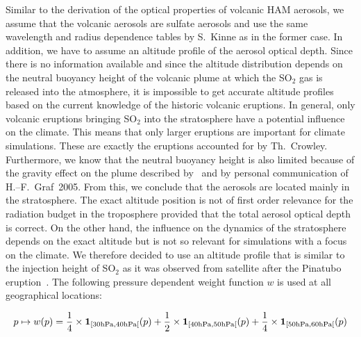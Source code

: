 \begin{appendix}
Similar to the derivation of the optical properties of volcanic HAM aerosols,
we assume that the volcanic aerosols are sulfate aerosols and use the
same wavelength and radius dependence tables by S.~Kinne as in the
former case. In addition, we have to assume an altitude profile of the
aerosol optical depth. Since there is no information available and
since the altitude distribution depends on the neutral buoyancy height
of the volcanic plume at which the 
SO$_2$ gas is released into the atmosphere, it is impossible to get
accurate altitude 
profiles based on the current knowledge of the historic volcanic
eruptions. In general, only volcanic eruptions bringing SO$_2$ into
the stratosphere have a potential influence on the climate. This means
that only larger eruptions are important for climate
simulations. These are exactly the eruptions accounted for by
Th.~Crowley. Furthermore, we know that the neutral buoyancy height is also
limited because of the gravity effect on the plume described
by~\cite{her106, tim093} and by personal communication of H.--F.~Graf~2005. From
this, we conclude that the aerosols are located mainly in the
stratosphere. The exact altitude position is not of first order
relevance for the radiation budget in the troposphere provided that the total
aerosol optical depth is correct. On the other hand, the influence on
the dynamics of the stratosphere depends on the exact altitude but is
not so relevant for simulations with a focus on the climate. We
therefore decided to use an altitude profile that is similar to the
injection height of SO$_2$ as it was observed from satellite after the Pinatubo
eruption~\cite{spa1997}. The following pressure dependent weight function $w$ is
used at all geographical locations:

\begin{equation}
p\mapsto w(p)=\frac{1}{4}\times{\bf 1}_{[30{\rm hPa},40{\rm hPa}[}(p) +
\frac{1}{2}\times{\bf 1}_{[40{\rm hPa},50{\rm hPa}[}(p)+\frac{1}{4}\times{\bf 1}_{[50{\rm hPa},60{\rm hPa}[}(p)
\end{equation}


\end{appendix}
